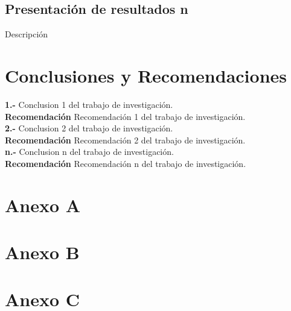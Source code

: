 \documentclass[oneside,11pt]{Latex/Classes/PhDthesisPSnPDF}
\begin{document}
\section{Presentación de resultados n}

Descripción\\

\chapter{Conclusiones y Recomendaciones}

\textbf{1.-} Conclusion 1 del trabajo de investigación.\\

\textbf{Recomendación} Recomendación 1 del trabajo de investigación.\\

\textbf{2.-} Conclusion 2 del trabajo de investigación.\\

\textbf{Recomendación} Recomendación 2 del trabajo de investigación.\\

\textbf{n.-} Conclusion n del trabajo de investigación.\\

\textbf{Recomendación} Recomendación n del trabajo de investigación.\\

\appendix
\renewcommand{\thechapter}{\Alph{chapter}}

\chapter{Anexo A}

\chapter{Anexo B}

\chapter{Anexo C}

\renewcommand{\bibname}{Lista de Referencias}
 
 

\end{document}
